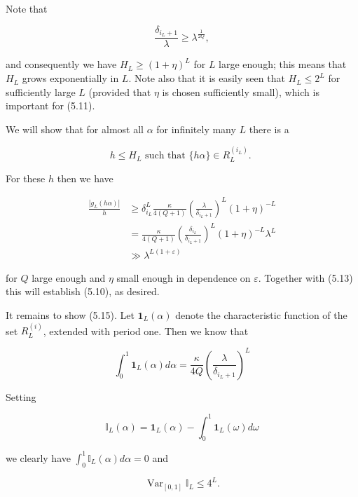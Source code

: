 \documentclass[10pt]{article}
\begin{document}
Note that

$$
\frac{\delta_{i_{L}+1}}{\lambda} \geqslant \lambda^{\frac{1}{2 Q}},
$$

and consequently we have $H_{L} \geqslant(1+\eta)^{L}$ for $L$ large enough; this means that $H_{L}$ grows exponentially in $L$. Note also that it is easily seen that $H_{L} \leqslant 2^{L}$ for sufficiently large $L$ (provided that $\eta$ is chosen sufficiently small), which is important for (5.11).

We will show that for almost all $\alpha$ for infinitely many $L$ there is a


\begin{equation*}
h \leqslant H_{L} \text { such that }\{h \alpha\} \in R_{L}^{\left(i_{L}\right)} \text {. } \tag{5.15}
\end{equation*}


For these $h$ then we have

$$
\begin{aligned}
\frac{\left|g_{L}(h \alpha)\right|}{h} & \geqslant \delta_{i_{L}}^{L} \frac{\kappa}{4(Q+1)}\left(\frac{\lambda}{\delta_{i_{L}+1}}\right)^{L}(1+\eta)^{-L} \\
& =\frac{\kappa}{4(Q+1)}\left(\frac{\delta_{i_{L}}}{\delta_{i_{L}+1}}\right)^{L}(1+\eta)^{-L} \lambda^{L} \\
& \gg \lambda^{L(1+\varepsilon)}
\end{aligned}
$$

for $Q$ large enough and $\eta$ small enough in dependence on $\varepsilon$. Together with (5.13) this will establish (5.10), as desired.

It remains to show (5.15). Let $\mathbf{1}_{L}(\alpha)$ denote the characteristic function of the set $R_{L}^{(i)}$, extended with period one. Then we know that


\begin{equation*}
\int_{0}^{1} \mathbf{1}_{L}(\alpha) d \alpha=\frac{\kappa}{4 Q}\left(\frac{\lambda}{\delta_{i_{L}+1}}\right)^{L} \tag{5.16}
\end{equation*}


Setting

$$
\mathbb{I}_{L}(\alpha)=\mathbf{1}_{L}(\alpha)-\int_{0}^{1} \mathbf{1}_{L}(\omega) d \omega
$$

we clearly have $\int_{0}^{1} \mathbb{I}_{L}(\alpha) d \alpha=0$ and


\begin{equation*}
\operatorname{Var}_{[0,1]} \mathbb{I}_{L} \leqslant 4^{L} . \tag{5.17}
\end{equation*}
\end{document}
